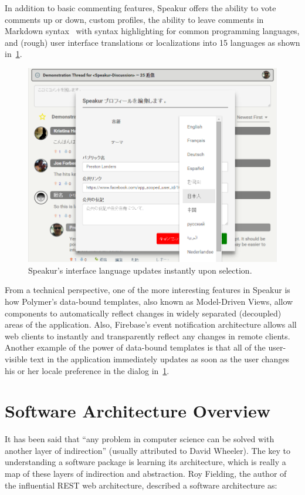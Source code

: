 In addition to basic commenting features, Speakur offers the ability to vote comments up or down, custom profiles, 
the ability to leave comments in Markdown syntax~\cite{githubcontributors2015} with syntax highlighting for common programming languages, 
and (rough) user interface translations  or localizations 
into 15 languages as shown in~\cref{f:lang}.

\begin{figure}[htb]
\centering
 \includegraphics[width=\textwidth]{images/screenshot_20150320_1923_lang.png}
\caption{Speakur's interface language updates instantly upon selection.}
\label{f:lang}
\end{figure}

From a technical perspective, one of the more interesting features in Speakur is how Polymer's data-bound templates, also known as Model-Driven Views, 
allow components to automatically reflect changes in widely separated (decoupled) areas of the application.
Also, Firebase's event notification architecture allows all web clients to instantly and transparently reflect any changes in remote clients.
Another example of the power of data-bound templates is that all of the user-visible text in the application immediately updates as soon as the user changes his or her locale preference in the dialog in~\cref{f:lang}.

\section{Software Architecture Overview}
It has been said that ``any problem in computer science can be solved with another layer of indirection'' (usually attributed to David Wheeler).
The key to understanding a software package is learning its architecture,
which is really a map of these layers of indirection and abstraction.
Roy Fielding, the author of the influential REST web architecture, described a software architecture as:

